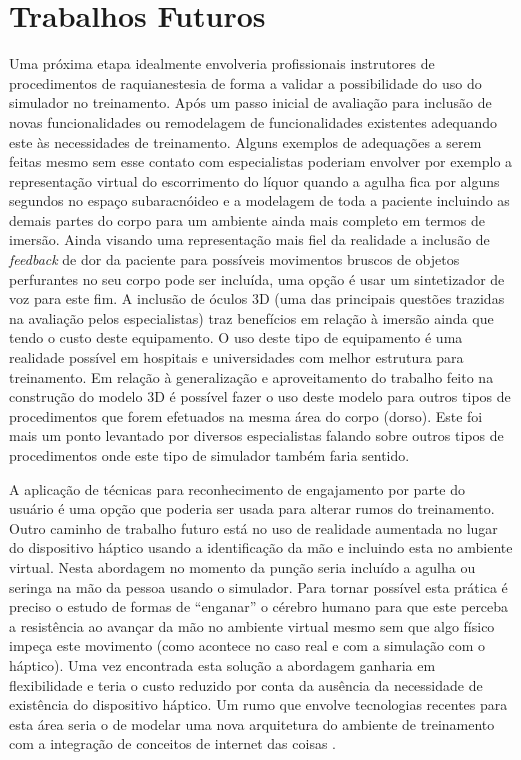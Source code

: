 \section{Trabalhos Futuros}
\label{sec:trabFuturo}

Uma próxima etapa idealmente envolveria profissionais instrutores de procedimentos de raquianestesia de forma a validar a possibilidade do uso do simulador no treinamento. Após um passo inicial de avaliação para inclusão de novas funcionalidades ou remodelagem de funcionalidades existentes adequando este às necessidades de treinamento. Alguns exemplos de adequações a serem feitas mesmo sem esse contato com especialistas poderiam envolver por exemplo a representação virtual do escorrimento do líquor quando a agulha fica por alguns segundos no espaço subaracnóideo e a modelagem de toda a paciente incluindo as demais partes do corpo para um ambiente ainda mais completo em termos de imersão. Ainda visando uma representação mais fiel da realidade a inclusão de \textit{feedback} de dor da paciente para possíveis movimentos bruscos de objetos perfurantes no seu corpo pode ser incluída, uma opção é usar um sintetizador de voz para este fim. A inclusão de óculos 3D (uma das principais questões trazidas na avaliação pelos especialistas) traz benefícios em relação à imersão ainda que tendo o custo deste equipamento. O uso deste tipo de equipamento é uma realidade possível em hospitais e universidades com melhor estrutura para treinamento.
Em relação à generalização e aproveitamento do trabalho feito na construção do modelo 3D é possível fazer o uso deste modelo para outros tipos de procedimentos que forem efetuados na mesma área do corpo (dorso). Este foi mais um ponto levantado por diversos especialistas falando sobre outros tipos de procedimentos onde este tipo de simulador também faria sentido.

A aplicação de técnicas para reconhecimento de engajamento por parte do usuário \cite{Mitsis2022} é uma opção que poderia ser usada para alterar rumos do treinamento.
Outro caminho de trabalho futuro está no uso de realidade aumentada no lugar do dispositivo háptico usando a identificação da mão e incluindo esta no ambiente virtual. Nesta abordagem no momento da punção seria incluído a agulha ou seringa na mão da pessoa usando o simulador. Para tornar possível esta prática é preciso o estudo de formas de ``enganar'' o cérebro humano para que este perceba a resistência ao avançar da mão no ambiente virtual mesmo sem que algo físico impeça este movimento (como acontece no caso real e com a simulação com o háptico). Uma vez encontrada esta solução a abordagem ganharia em flexibilidade e teria o custo reduzido por conta da ausência da necessidade de existência do dispositivo háptico. Um rumo que envolve tecnologias recentes para esta área seria o de modelar uma nova arquitetura do ambiente de treinamento com a integração de conceitos de internet das coisas \cite{Ahmad2022}.